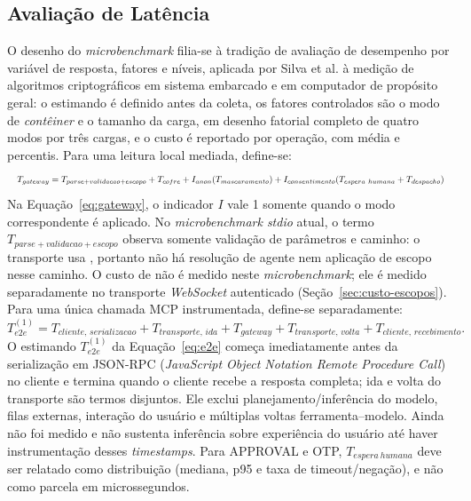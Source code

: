 \documentclass[12pt,openright,twoside,a4paper,english,brazil]{abntex2}
\begin{document}
\subsection{Avaliação de Latência}
O desenho do \textit{microbenchmark} filia-se à tradição de avaliação de desempenho por variável de resposta, fatores e níveis, aplicada por Silva et al. \cite{silva2016} à medição de algoritmos criptográficos em sistema embarcado e em computador de propósito geral: o estimando é definido antes da coleta, os fatores controlados são o modo de \textit{contêiner} e o tamanho da carga, em desenho fatorial completo de quatro modos por três cargas, e o custo é reportado por operação, com média e percentis. Para uma leitura local mediada, define-se:
\begin{equation}
\resizebox{\textwidth}{!}{$\displaystyle T_{gateway}=T_{parse+validacao+escopo}+T_{cofre}+I_{anon}(T_{mascaramento})+I_{consentimento}(T_{espera\ humana}+T_{despacho})$}
\label{eq:gateway}
\end{equation}
Na Equação~\eqref{eq:gateway}, o indicador $I$ vale 1 somente quando o modo correspondente é aplicado. No \textit{microbenchmark stdio} atual, o termo $T_{parse+validacao+escopo}$ observa somente validação de parâmetros e caminho: o transporte usa , portanto não há resolução de agente nem aplicação de escopo nesse caminho. O custo de  não é medido neste \textit{microbenchmark}; ele é medido separadamente no transporte \textit{WebSocket} autenticado (Seção~\ref{sec:custo-escopos}). Para uma única chamada MCP instrumentada, define-se separadamente:
\begin{equation}
T_{e2e}^{(1)}=T_{cliente,\,serializacao}+T_{transporte,\,ida}+T_{gateway}+T_{transporte,\,volta}+T_{cliente,\,recebimento}.
\label{eq:e2e}
\end{equation}
O estimando $T_{e2e}^{(1)}$ da Equação~\eqref{eq:e2e} começa imediatamente antes da serialização em JSON-RPC (\textit{JavaScript Object Notation Remote Procedure Call}) no cliente e termina quando o cliente recebe a resposta completa; ida e volta do transporte são termos disjuntos. Ele exclui planejamento/inferência do modelo, filas externas, interação do usuário e múltiplas voltas ferramenta--modelo. Ainda não foi medido e não sustenta inferência sobre experiência do usuário até haver instrumentação desses \textit{timestamps}. Para APPROVAL e OTP, $T_{espera\ humana}$ deve ser relatado como distribuição (mediana, p95 e taxa de timeout/negação), e não como parcela em microssegundos.
\end{document}
